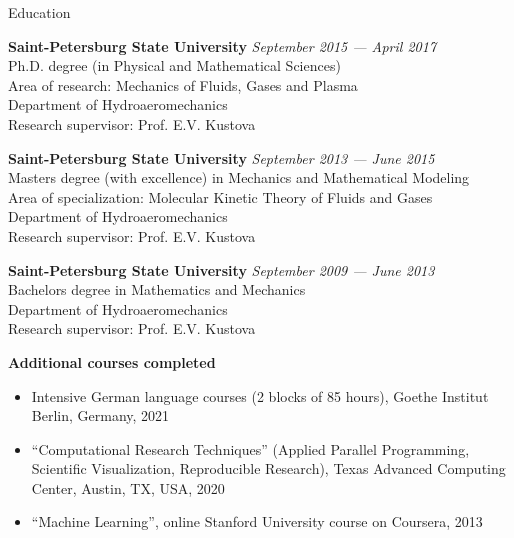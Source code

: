 \documentclass{resume} %
\begin{document}
\begin{rSection}{Education}

{\bf Saint-Petersburg State University} \hfill {\em September 2015 --- April 2017} \\ 
Ph.D. degree (in Physical and Mathematical Sciences)\\
Area of research: Mechanics of Fluids, Gases and Plasma \\
Department of Hydroaeromechanics \smallskip \\
Research supervisor: Prof. E.V. Kustova

{\bf Saint-Petersburg State University} \hfill {\em September 2013 --- June 2015} \\ 
Masters degree (with excellence) in Mechanics and Mathematical Modeling\\
Area of specialization: Molecular Kinetic Theory of Fluids and Gases\\
Department of Hydroaeromechanics \smallskip \\
Research supervisor: Prof. E.V. Kustova 

{\bf Saint-Petersburg State University} \hfill {\em September 2009 --- June 2013} \\ 
Bachelors degree in Mathematics and Mechanics \\
Department of Hydroaeromechanics \smallskip \\
Research supervisor: Prof. E.V. Kustova
\end{rSection}

{\bf Additional courses completed}
\begin{itemize}
    \item Intensive German language courses (2 blocks of 85 hours), Goethe Institut Berlin, Germany, 2021
    \item ``Computational Research Techniques'' (Applied Parallel Programming, Scientific Visualization, Reproducible Research), Texas Advanced Computing Center, Austin, TX, USA, 2020
    \item ``Machine Learning'', online Stanford University course on Coursera, 2013
\end{itemize}

\end{document}
